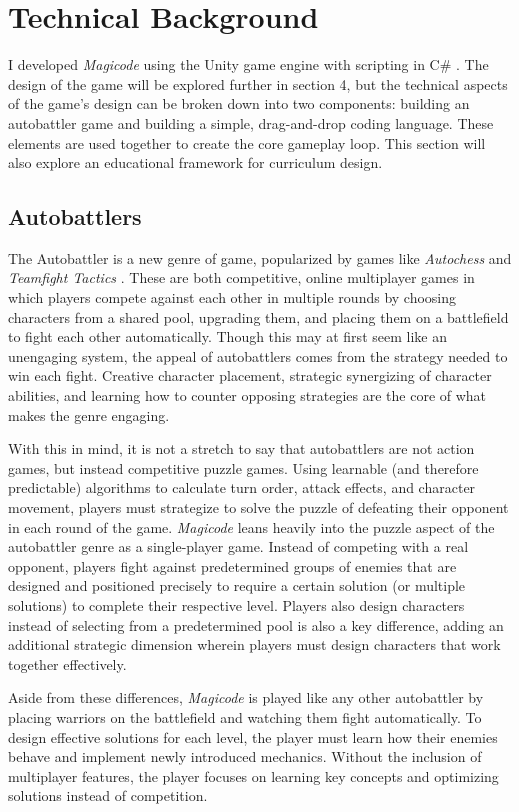 \documentclass[10pt,twocolumn]{article}
\begin{document}
\section{Technical Background}
I developed \textit{Magicode} using the Unity game engine with scripting in C\# \cite{unity-website}. The design of the game will be explored further in section 4, but the technical aspects of the game’s design can be broken down into two components: building an autobattler game and building a simple, drag-and-drop coding language. These elements are used together to create the core gameplay loop. This section will also explore an educational framework for curriculum design.

\subsection{Autobattlers}
The Autobattler is a new genre of game, popularized by games like \textit{Autochess} \cite{autochess-steam} and \textit{Teamfight Tactics} \cite{tft}. These are both competitive, online multiplayer games in which players compete against each other in multiple rounds by choosing characters from a shared pool, upgrading them, and placing them on a battlefield to fight each other automatically. Though this may at first seem like an unengaging system, the appeal of autobattlers comes from the strategy needed to win each fight. Creative character placement, strategic synergizing of character abilities, and learning how to counter opposing strategies are the core of what makes the genre engaging.

With this in mind, it is not a stretch to say that autobattlers are not action games, but instead competitive puzzle games. Using learnable (and therefore predictable) algorithms to calculate turn order, attack effects, and character movement, players must strategize to solve the puzzle of defeating their opponent in each round of the game. \textit{Magicode} leans heavily into the puzzle aspect of the autobattler genre as a single-player game. Instead of competing with a real opponent, players fight against predetermined groups of enemies that are designed and positioned precisely to require a certain solution (or multiple solutions) to complete their respective level. Players also design characters instead of selecting from a predetermined pool is also a key difference, adding an additional strategic dimension wherein players must design characters that work together effectively.

Aside from these differences, \textit{Magicode} is played like any other autobattler by placing warriors on the battlefield and watching them fight automatically. To design effective solutions for each level, the player must learn how their enemies behave and implement newly introduced mechanics. Without the inclusion of multiplayer features, the player focuses on learning key concepts and optimizing solutions instead of competition.
\end{document}
